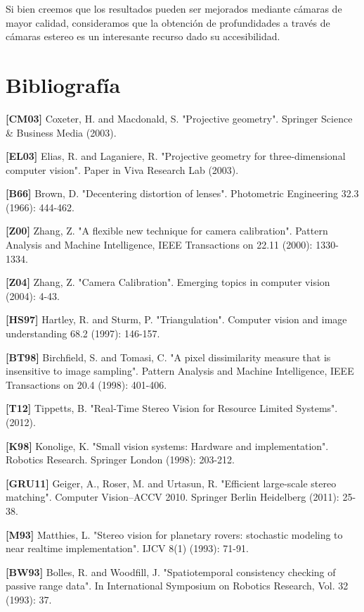 \documentclass[11pt,a4paper,titlepage]{article}
\begin{document}
Si bien creemos que los resultados pueden ser mejorados mediante cámaras de mayor calidad, consideramos que la obtención de profundidades a través de cámaras estereo es un interesante recurso dado su accesibilidad.

\newpage

\section{Bibliografía}

\textbf{[CM03]} Coxeter, H. and Macdonald, S. "Projective geometry". Springer Science \& Business Media (2003).

\textbf{[EL03]} Elias, R. and Laganiere, R. "Projective geometry for three-dimensional computer vision". Paper in Viva Research Lab (2003).

\textbf{[B66]} Brown, D. "Decentering distortion of lenses". Photometric Engineering 32.3 (1966): 444-462.

\textbf{[Z00]} Zhang, Z. "A flexible new technique for camera calibration". Pattern Analysis and Machine Intelligence, IEEE Transactions on 22.11 (2000): 1330-1334.

\textbf{[Z04]} Zhang, Z. "Camera Calibration". Emerging topics in computer vision (2004): 4-43.

\textbf{[HS97]} Hartley, R. and Sturm, P. "Triangulation". Computer vision and image understanding 68.2 (1997): 146-157.

\textbf{[BT98]} Birchfield, S. and Tomasi, C. "A pixel dissimilarity measure that is insensitive to image sampling". Pattern Analysis and Machine Intelligence, IEEE Transactions on 20.4 (1998): 401-406.

\textbf{[T12]} Tippetts, B. "Real-Time Stereo Vision for Resource Limited Systems". (2012).

\textbf{[K98]} Konolige, K. "Small vision systems: Hardware and implementation". Robotics Research. Springer London (1998): 203-212.

\textbf{[GRU11]} Geiger, A., Roser, M. and Urtasun, R. "Efficient large-scale stereo matching". Computer Vision–ACCV 2010. Springer Berlin Heidelberg (2011): 25-38.

\textbf{[M93]} Matthies, L. "Stereo vision for planetary rovers: stochastic modeling to near realtime implementation". IJCV 8(1) (1993): 71-91.

\textbf{[BW93]} Bolles, R. and Woodfill, J. "Spatiotemporal consistency checking of passive range data". In International Symposium on Robotics Research, Vol. 32 (1993): 37.
\end{document}

